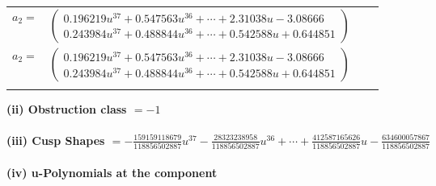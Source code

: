 \documentclass[1p]{elsarticle_modified}
\theoremstyle{definition}
\begin{document}
\begin{tabular}{m{7pt} m{180pt} m{7pt} m{180pt} }
\flushright $a_{2}=$&$\begin{pmatrix}0.196219 u^{37}+0.547563 u^{36}+\cdots+2.31038 u-3.08666\\0.243984 u^{37}+0.488844 u^{36}+\cdots+0.542588 u+0.644851\end{pmatrix}$\\ \flushright $a_{2}=$&$\begin{pmatrix}0.196219 u^{37}+0.547563 u^{36}+\cdots+2.31038 u-3.08666\\0.243984 u^{37}+0.488844 u^{36}+\cdots+0.542588 u+0.644851\end{pmatrix}$\\&\end{tabular}
\flushleft \textbf{(ii) Obstruction class $= -1$}\\~\\
\flushleft \textbf{(iii) Cusp Shapes $= -\frac{159159118679}{118856502887} u^{37}-\frac{28323238958}{118856502887} u^{36}+\cdots+\frac{412587165626}{118856502887} u-\frac{634600057867}{118856502887}$}\\~\\
\newpage\renewcommand{\arraystretch}{1}
\flushleft \textbf{(iv) u-Polynomials at the component}\newline \\
\end{document}
